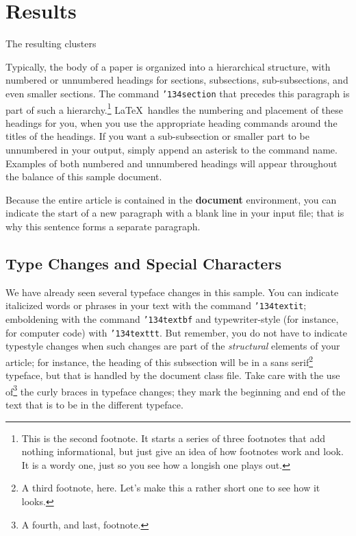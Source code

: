 \documentclass{acm_proc_article-sp}
\begin{document}
\section{Results}


The resulting clusters 

Typically, the body of a paper is organized
into a hierarchical structure, with numbered or unnumbered
headings for sections, subsections, sub-subsections, and even
smaller sections.  The command \texttt{{\char'134}section} that
precedes this paragraph is part of such a
hierarchy.\footnote{This is the second footnote.  It
starts a series of three footnotes that add nothing
informational, but just give an idea of how footnotes work
and look. It is a wordy one, just so you see
how a longish one plays out.} \LaTeX\ handles the numbering
and placement of these headings for you, when you use
the appropriate heading commands around the titles
of the headings.  If you want a sub-subsection or
smaller part to be unnumbered in your output, simply append an
asterisk to the command name.  Examples of both
numbered and unnumbered headings will appear throughout the
balance of this sample document.

Because the entire article is contained in
the \textbf{document} environment, you can indicate the
start of a new paragraph with a blank line in your
input file; that is why this sentence forms a separate paragraph.

\subsection{Type Changes and {\subsecit Special} Characters}
We have already seen several typeface changes in this sample.  You
can indicate italicized words or phrases in your text with
the command \texttt{{\char'134}textit}; emboldening with the
command \texttt{{\char'134}textbf}
and typewriter-style (for instance, for computer code) with
\texttt{{\char'134}texttt}.  But remember, you do not
have to indicate typestyle changes when such changes are
part of the \textit{structural} elements of your
article; for instance, the heading of this subsection will
be in a sans serif\footnote{A third footnote, here.
Let's make this a rather short one to
see how it looks.} typeface, but that is handled by the
document class file. Take care with the use
of\footnote{A fourth, and last, footnote.}
the curly braces in typeface changes; they mark
the beginning and end of
the text that is to be in the different typeface.
\end{document}
